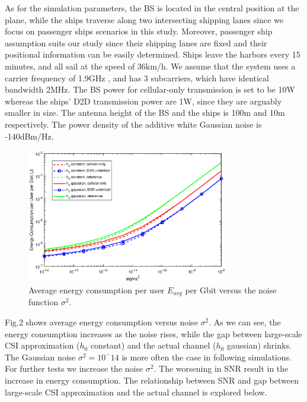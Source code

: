 \documentclass{ieeeaccess}
\begin{document}
As for the simulation parameters, the BS is located in the central position at the plane, while the ships traverse along two intersecting shipping lanes since we focus on passenger ships scenarios in this study. Moreover, passenger ship assumption suits our study since their shipping lanes are fixed and their positional information can be easily determined. Ships leave the harbors every 15 minutes, and all sail at the speed of 36km/h. We assume that the system uses a carrier frequency of 1.9GHz , and has 3 subcarriers, which have identical bandwidth 2MHz. The BS power for cellular-only transmission is set to be 10W whereas the ships' D2D transmission power are 1W, since they are arguably smaller in size. The antenna height of the BS and the ships is 100m and 10m respectively. The power density of the additive white Gaussian noise is -140dBm/Hz.


\begin{figure} [htb]
\includegraphics*[width=8.8cm]{sigma2s.eps}
\caption{Average energy consumption per user $E_{avg}$ per Gbit versus the noise function ${\sigma ^2}$.}\label{fig:2}
\end{figure}



Fig.2 shows average energy consumption versus noise ${\sigma ^2}$. As we can see, the energy consumption increases as the noise rises, while the gap between large-scale CSI approximation (${h_0}$ constant) and the actual channel (${h_0}$ gaussian) shrinks. The Gaussian noise ${\sigma ^2 = 10^-14}$ is more often the case in following simulations. For further tests we increase the noise ${\sigma ^2}$. The worsening in SNR result in the increase in energy consumption. The relationship between SNR and  gap between large-scale CSI approximation and the actual channel is explored below. 
\end{document}
